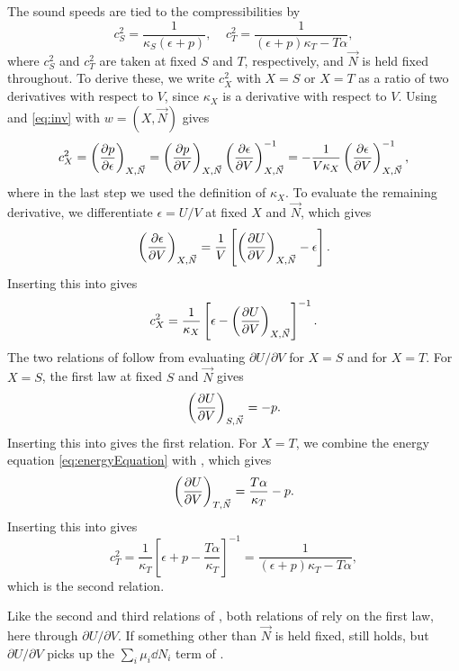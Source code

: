 The sound speeds are tied to the compressibilities by
\begin{equation}\label{eq:soundCompressibility}
c_S^2=\frac{1}{\kappa_S(\epsilon+p)},~~~~~
c_T^2=\frac{1}{(\epsilon+p)\kappa_T-T\alpha},
\end{equation}
where $c_S^2$ and $c_T^2$ are taken at fixed $S$ and $T$, respectively, and
$\vec{N}$ is held fixed throughout. To derive these, we write $c_X^2$ with $X=S$ or
$X=T$ as a ratio of two derivatives with respect to $V$, since $\kappa_X$ is
a derivative with respect to $V$. Using  and \eqref{eq:inv}
with $w=(X,\vec{N})$ gives
\begin{equation}\label{eq:cXratio}
c_X^2=\left(\pdv{p}{\epsilon}\right)_{X,\vec{N}}
=\left(\pdv{p}{V}\right)_{X,\vec{N}}\left(\pdv{\epsilon}{V}\right)_{X,\vec{N}}^{-1}
=-\frac{1}{V\kappa_X}\left(\pdv{\epsilon}{V}\right)_{X,\vec{N}}^{-1},
\end{equation}
where in the last step we used the definition of $\kappa_X$.
To evaluate the remaining derivative, we differentiate $\epsilon=U/V$ at fixed $X$ and
$\vec{N}$, which gives
\begin{equation}
\left(\pdv{\epsilon}{V}\right)_{X,\vec{N}}
=\frac{1}{V}\left[\left(\pdv{U}{V}\right)_{X,\vec{N}}-\epsilon\right].
\end{equation}
Inserting this into  gives
\begin{equation}\label{eq:cXgeneral}
c_X^2=\frac{1}{\kappa_X}\left[\epsilon-\left(\pdv{U}{V}\right)_{X,\vec{N}}\right]^{-1}.
\end{equation}
The two relations of  follow from evaluating
$\partial U/\partial V$ for $X=S$ and for $X=T$.
For $X=S$, the first law  at fixed $S$ and $\vec{N}$ gives
\begin{equation}
\left(\pdv{U}{V}\right)_{S,\vec{N}}=-p.
\end{equation}
Inserting this into  gives
the first relation.
For $X=T$, we combine the energy equation \eqref{eq:energyEquation} with
, which gives
\begin{equation}
\left(\pdv{U}{V}\right)_{T,\vec{N}}=\frac{T\alpha}{\kappa_T}-p.
\end{equation}
Inserting this into  gives
\begin{equation}
c_T^2=\frac{1}{\kappa_T}\left[\epsilon+p-\frac{T\alpha}{\kappa_T}\right]^{-1}
=\frac{1}{(\epsilon+p)\kappa_T-T\alpha},
\end{equation}
which is the second relation.

Like the second and third relations of , both
relations of  rely on the first law, here through
$\partial U/\partial V$. If something other than $\vec{N}$ is held fixed,
 still holds, but $\partial U/\partial V$ picks up the
$\sum_i\mu_i\dd N_i$ term of .





